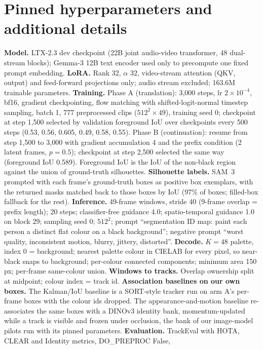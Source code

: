 \documentclass{article} %
\begin{document}
\section{Pinned hyperparameters and additional details}
\label{app:params}
\textbf{Model.} LTX-2.3 dev checkpoint (22B joint audio-video transformer, 48 dual-stream
blocks); Gemma-3 12B text encoder used only to precompute one fixed prompt embedding.
\textbf{LoRA.} Rank 32, $\alpha$ 32, video-stream attention (QKV, output) and feed-forward
projections only; audio stream excluded; 163.6M trainable parameters.
\textbf{Training.} Phase A (translation): 3,000 steps, lr $2\times10^{-4}$, bf16, gradient
checkpointing, flow matching with shifted-logit-normal timestep sampling, batch 1, 777
preprocessed clips ($512^2\times49$), training seed 0; checkpoint at step 1,500 selected by
validation foreground IoU over checkpoints every 500 steps (0.53, 0.56, 0.605, 0.49, 0.58,
0.55). Phase B (continuation): resume from step 1,500 to 3,000 with gradient accumulation 4
and the prefix condition (2 latent frames, $p=0.5$); checkpoint at step 2,500 selected the
same way (foreground IoU 0.589). Foreground IoU is the IoU of the non-black region against
the union of ground-truth silhouettes.
\textbf{Silhouette labels.} SAM~3 prompted with each frame's ground-truth boxes as positive
box exemplars, with the returned masks matched back to those boxes by IoU (97\% of boxes;
filled-box fallback for the rest).
\textbf{Inference.} 49-frame windows, stride 40 (9-frame overlap = prefix length); 20
steps; classifier-free guidance 4.0; spatio-temporal guidance 1.0 on block 29; sampling
seed 0; $512^2$; prompt ``segmentation ID map: paint each person a distinct flat colour on
a black background''; negative prompt ``worst quality, inconsistent motion, blurry,
jittery, distorted''.
\textbf{Decode.} $K{=}48$ palette, index 0 = background; nearest palette colour in CIELAB
for every pixel, so near-black snaps to background; per-colour connected components;
minimum area 150 px; per-frame same-colour union.
\textbf{Windows to tracks.} Overlap ownership split at midpoint; colour index = track id.
\textbf{Association baselines on our own boxes.} The Kalman/IoU baseline is a SORT-style
tracker \citep{bewley2016sort} run on arm A's per-frame boxes with the colour ids dropped.
The appearance-and-motion baseline re-associates the same boxes with a DINOv3 identity bank,
momentum-updated while a track is visible and frozen under occlusion, the bank of our
image-model pilots run with its pinned parameters.
\textbf{Evaluation.} TrackEval with HOTA, CLEAR and Identity metrics, DO\_PREPROC False,
\end{document}
